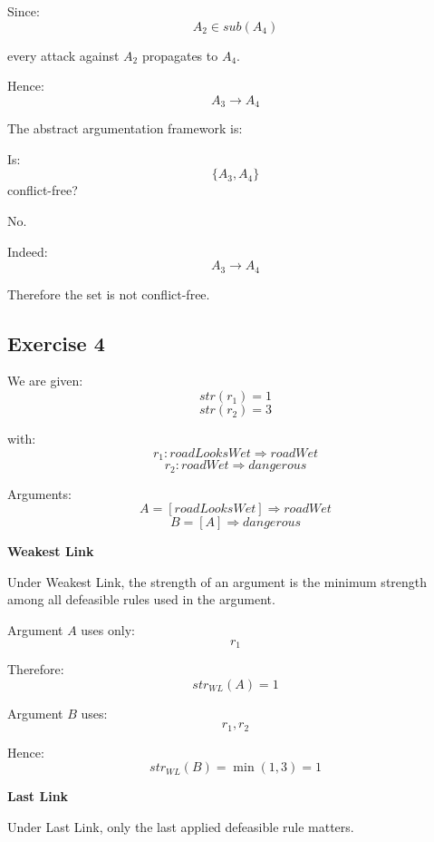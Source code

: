 \documentclass[11pt]{article}
\begin{document}
Since:
\[
A_2 \in sub(A_4)
\]

every attack against $A_2$ propagates to $A_4$.

Hence:
\[
A_3 \to A_4
\]

\bigskip

The abstract argumentation framework is:

\begin{center}
\end{center}

\bigskip

Is:
\[
\{A_3,A_4\}
\]
conflict-free?

No.

Indeed:
\[
A_3 \to A_4
\]

Therefore the set is not conflict-free.

\subsection{Exercise 4}

We are given:
\[
str(r_1)=1
\]
\[
str(r_2)=3
\]

with:
\[
r_1: roadLooksWet \Rightarrow roadWet
\]
\[
r_2: roadWet \Rightarrow dangerous
\]

Arguments:
\[
A=[roadLooksWet]\Rightarrow roadWet
\]
\[
B=[A]\Rightarrow dangerous
\]

\bigskip

\textbf{Weakest Link}

Under Weakest Link, the strength of an argument is the minimum strength among all defeasible rules used in the argument.

\bigskip

Argument $A$ uses only:
\[
r_1
\]

Therefore:
\[
str_{WL}(A)=1
\]

Argument $B$ uses:
\[
r_1,r_2
\]

Hence:
\[
str_{WL}(B)=\min(1,3)=1
\]

\bigskip

\textbf{Last Link}

Under Last Link, only the last applied defeasible rule matters.
\end{document}
